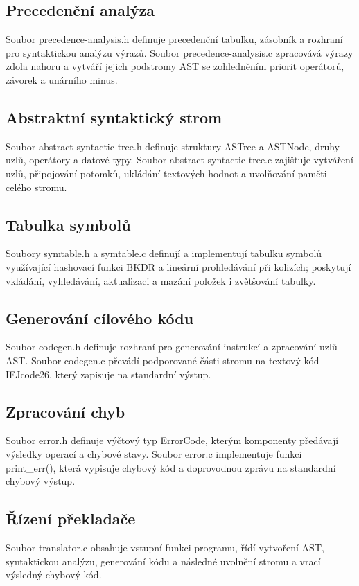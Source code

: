 \documentclass[a4paper, 11pt]{article}
\begin{document}
\subsection{Precedenční analýza}
Soubor precedence-analysis.h definuje precedenční tabulku, zásobník a rozhraní pro syntaktickou analýzu výrazů. Soubor precedence-analysis.c zpracovává výrazy zdola nahoru a vytváří jejich podstromy AST se zohledněním priorit operátorů, závorek a unárního minus.

\subsection{Abstraktní syntaktický strom}
Soubor abstract-syntactic-tree.h definuje struktury ASTree a ASTNode, druhy uzlů, operátory a datové typy. Soubor abstract-syntactic-tree.c zajišťuje vytváření uzlů, připojování potomků, ukládání textových hodnot a uvolňování paměti celého stromu.

\subsection{Tabulka symbolů}
Soubory symtable.h a symtable.c definují a implementují tabulku symbolů využívající hashovací funkci BKDR a lineární prohledávání při kolizích; poskytují vkládání, vyhledávání, aktualizaci a mazání položek i zvětšování tabulky.

\subsection{Generování cílového kódu}
Soubor codegen.h definuje rozhraní pro generování instrukcí a zpracování uzlů AST. Soubor codegen.c převádí podporované části stromu na textový kód IFJcode26, který zapisuje na standardní výstup.

\subsection{Zpracování chyb}
Soubor error.h definuje výčtový typ ErrorCode, kterým komponenty předávají výsledky operací a chybové stavy. Soubor error.c implementuje funkci print\_err(), která vypisuje chybový kód a doprovodnou zprávu na standardní chybový výstup.

\subsection{Řízení překladače}
Soubor translator.c obsahuje vstupní funkci programu, řídí vytvoření AST, syntaktickou analýzu, generování kódu a následné uvolnění stromu a vrací výsledný chybový kód.
\end{document}
